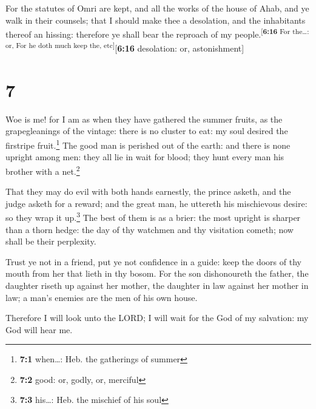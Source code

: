  For the statutes of Omri are kept, and all the works of
the house of Ahab, and ye walk in their counsels; that I should make
thee a desolation, and the inhabitants thereof an hissing: therefore ye
shall bear the reproach of my people.\textsuperscript{{[}\textbf{6:16}
For the\ldots: or, For he doth much keep the, etc{]}}{[}\textbf{6:16}
desolation: or, astonishment{]}

\hypertarget{section-6}{%
\section{7}\label{section-6}}

 Woe is me! for I am as when they have gathered the summer
fruits, as the grapegleanings of the vintage: there is no cluster to
eat: my soul desired the firstripe fruit.\footnote{\textbf{7:1}
  when\ldots: Heb. the gatherings of summer}  The good man
is perished out of the earth: and there is none upright among men: they
all lie in wait for blood; they hunt every man his brother with a
net.\footnote{\textbf{7:2} good: or, godly, or, merciful}

 That they may do evil with both hands earnestly, the
prince asketh, and the judge asketh for a reward; and the great man, he
uttereth his mischievous desire: so they wrap it up.\footnote{\textbf{7:3}
  his\ldots: Heb. the mischief of his soul}  The best of
them is as a brier: the most upright is sharper than a thorn hedge: the
day of thy watchmen and thy visitation cometh; now shall be their
perplexity.

 Trust ye not in a friend, put ye not confidence in a
guide: keep the doors of thy mouth from her that lieth in thy bosom.
 For the son dishonoureth the father, the daughter riseth
up against her mother, the daughter in law against her mother in law; a
man's enemies are the men of his own house.

 Therefore I will look unto the LORD; I will wait for the
God of my salvation: my God will hear me.

